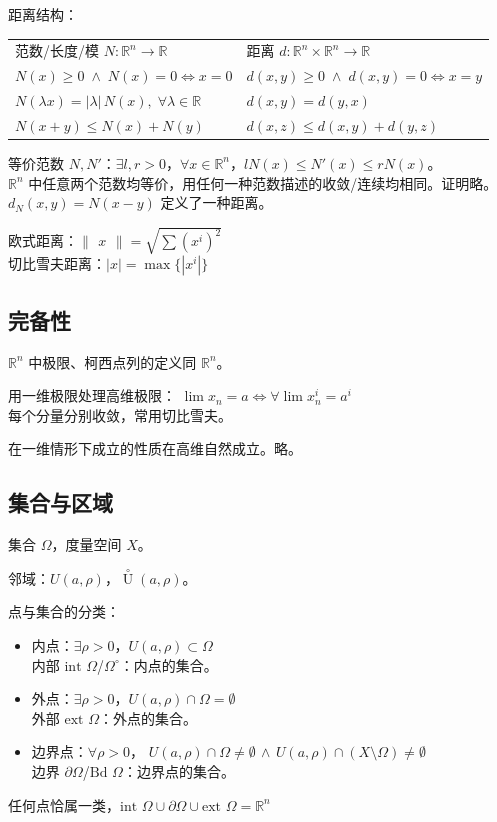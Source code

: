 \documentclass[12pt, a4paper, UTF8, openany]{ctexbook}
\newcommand{\field}[1]{\mathbb{#1}}%
\newcommand{\R}[1]{\field{R}^{#1}}
\newcommand{\uzero}{\mathop{U}\limits^{\circ}}%
\newcommand{\len}[1]{\begin{Vmatrix}#1\end{Vmatrix}}%
\newcommand{\inter}[1]{\text{int }{#1}}%
\newcommand{\exter}[1]{\text{ext }{#1}}%
\newcommand{\border}[1]{\partial{#1}}%
\begin{document}
        距离结构：
        \begin{longtable}[h]{*{2}{w{l}{9cm}}}
            范数/长度/模 $N: \R{n} \to \R{}$ & 
            距离 $d: \R{n} \times \R{n} \to \R{}$ \\
            $N(x) \geqslant 0 \;\land\; N(x) = 0 \iff x = 0$ & $d(x, y) \geqslant 0 \;\land\; d(x, y) = 0 \iff x = y$ \\
            $N(\lambda x) = |\lambda|\, N(x), \; \forall \lambda \in \R{}$ & $d(x, y) = d(y, x)$ \\
            $N(x + y) \leqslant N(x) + N(y)$ & $d(x, z) \leqslant d(x, y) + d(y, z)$
        \end{longtable}

        等价范数 $N, N'$：$\exists l, r > 0$，$\forall x \in \field{R}^n$，$lN(x) \leqslant N'(x) \leqslant rN(x)$。\\
        $\R{n}$ 中任意两个范数均等价，用任何一种范数描述的收敛/连续均相同。证明略。\\
        $d_N(x, y) = N(x - y)$ 定义了一种距离。

        欧式距离：$\len{x} = \sqrt{\sum (x^i)^2}$ \\
        切比雪夫距离：$|x| = \max\{|x^i|\}$

        \subsection{完备性}
        $\R{n}$ 中极限、柯西点列的定义同 $\R{n}$。

        用一维极限处理高维极限：
        $\lim x_n = a \iff \forall \lim x_n^i = a^i$ \\
        {\heiti 每个分量分别收敛}，常用{\heiti 切比雪夫}。

        在一维情形下成立的性质在高维自然成立。略。

        \subsection{集合与区域}
        集合 $\Omega$，度量空间 $X$。

        邻域：$U(a, \rho)$，$\uzero(a, \rho)$。

        点与集合的分类：
        \begin{itemize}
            \item 内点：$\exists \rho > 0$，$U(a, \rho) \subset \Omega$ \\
                内部 $\inter{\Omega}$/$\Omega^{\circ}$：内点的集合。
            \item 外点：$\exists \rho > 0$，$U(a, \rho) \cap \Omega = \emptyset$ \\
                外部 $\exter{\Omega}$：外点的集合。
            \item 边界点：$\forall \rho > 0$，
                $U(a, \rho) \cap \Omega \neq \emptyset \, \land \, U(a, \rho) \cap (X \setminus \Omega) \neq \emptyset$ \\
                边界 $\border{\Omega}$/$\text{Bd }\Omega$：边界点的集合。
        \end{itemize}
        任何点恰属一类，$\inter{\Omega} \cup \border{\Omega} \cup \exter{\Omega} = \R{n}$
\end{document}
